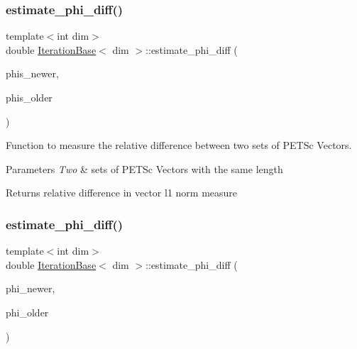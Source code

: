 \subsubsection{\texorpdfstring{estimate\+\_\+phi\+\_\+diff()}{estimate\_phi\_diff()}\hspace{0.1cm}{\footnotesize\ttfamily [1/4]}}
{\footnotesize\ttfamily template$<$int dim$>$ \\
double \hyperlink{class_iteration_base}{Iteration\+Base}$<$ dim $>$\+::estimate\+\_\+phi\+\_\+diff (\begin{DoxyParamCaption}\item[{std\+::vector$<$ P\+E\+T\+Sc\+Wrappers\+::\+M\+P\+I\+::\+Vector $\ast$$>$ \&}]{phis\+\_\+newer,  }\item[{std\+::vector$<$ P\+E\+T\+Sc\+Wrappers\+::\+M\+P\+I\+::\+Vector $\ast$$>$ \&}]{phis\+\_\+older }\end{DoxyParamCaption})\hspace{0.3cm}{\ttfamily [protected]}}



Function to measure the relative difference between two sets of P\+E\+T\+Sc Vectors. 


\begin{DoxyParams}{Parameters}
{\em Two} & sets of P\+E\+T\+Sc Vectors with the same length \\
\hline
\end{DoxyParams}
\begin{DoxyReturn}{Returns}
relative difference in vector l1 norm measure 
\end{DoxyReturn}
\mbox{\label{class_iteration_base_a5b823c5dda090e64bdba2abb815dfbf6}} 
\subsubsection{\texorpdfstring{estimate\+\_\+phi\+\_\+diff()}{estimate\_phi\_diff()}\hspace{0.1cm}{\footnotesize\ttfamily [2/4]}}
{\footnotesize\ttfamily template$<$int dim$>$ \\
double \hyperlink{class_iteration_base}{Iteration\+Base}$<$ dim $>$\+::estimate\+\_\+phi\+\_\+diff (\begin{DoxyParamCaption}\item[{P\+E\+T\+Sc\+Wrappers\+::\+M\+P\+I\+::\+Vector $\ast$}]{phi\+\_\+newer,  }\item[{P\+E\+T\+Sc\+Wrappers\+::\+M\+P\+I\+::\+Vector $\ast$}]{phi\+\_\+older }\end{DoxyParamCaption})\hspace{0.3cm}{\ttfamily [protected]}}

